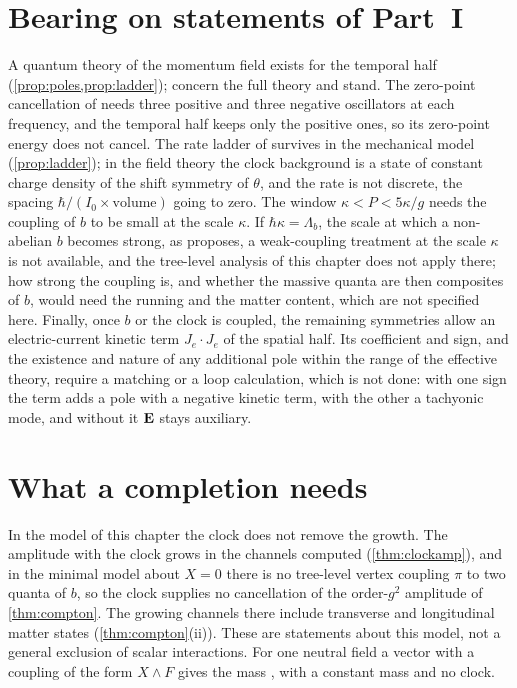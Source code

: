 \section{Bearing on statements of Part~I}

A quantum theory of the momentum field exists for the temporal half (\cref{prop:poles,prop:ladder}); 
concern the full theory and stand. The zero-point cancellation of  needs three positive and three negative oscillators at each
frequency, and the temporal half keeps only the positive ones, so its zero-point energy does not cancel. The rate ladder of
 survives in the mechanical model (\cref{prop:ladder}); in the field theory the clock background is a state of constant
charge density of the shift symmetry of $\theta$, and the rate is not discrete, the spacing $\hbar/(I_0\times\text{volume})$ going to zero.
The window $\kappa<P<5\kappa/g$ needs the coupling of $b$ to be small at the scale $\kappa$. If $\hbar\kappa=\Lambda_b$, the scale at which
a non-abelian $b$ becomes strong, as  proposes, a weak-coupling treatment at the scale $\kappa$ is not available, and
the tree-level analysis of this chapter does not apply there; how strong the coupling is, and whether the massive quanta are then
composites of $b$, would need the running and the matter content, which are not specified here. Finally, once $b$ or the clock is coupled,
the remaining symmetries allow an electric-current kinetic term $J_e\!\cdot\!J_e$ of the spatial half. Its coefficient and sign, and the
existence and nature of any additional pole within the range of the effective theory, require a matching or a loop calculation, which is
not done: with one sign the term adds a pole with a negative kinetic term, with the other a tachyonic mode, and without it $\mathbf E$ stays
auxiliary.

\section{What a completion needs}
\label{sec:needs}

In the model of this chapter the clock does not remove the growth. The amplitude with the clock grows in the channels computed
(\cref{thm:clockamp}), and in the minimal model about $X=0$ there is no tree-level vertex coupling $\pi$ to two quanta of $b$, so the clock
supplies no cancellation of the order-$g^2$ amplitude of \cref{thm:compton}. The growing channels there include transverse and longitudinal
matter states (\cref{thm:compton}(ii)). These are statements about this model, not a general exclusion of scalar interactions. For one
neutral field a vector with a coupling of the form $X\wedge F$ gives the mass \cite{CremmerScherk74,AllenBowickLahiri91}, with a constant
mass and no clock.

